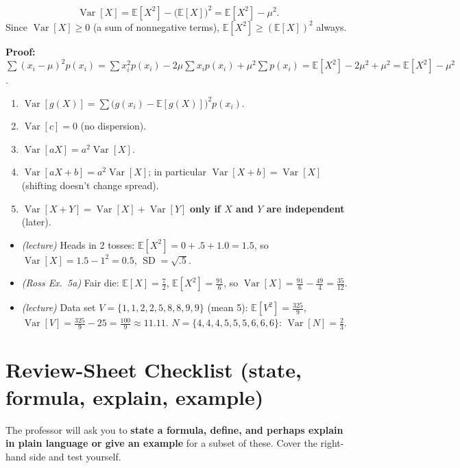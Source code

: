 \documentclass[11pt]{article}
\newcommand{\E}{\mathbb{E}}
\newcommand{\Var}{\operatorname{Var}}
\newcommand{\SD}{\operatorname{SD}}
\begin{document}
\begin{thmbox}
\[ \Var[X]=\E[X^2]-\big(\E[X]\big)^2=\E[X^2]-\mu^2. \]
Since $\Var[X]\ge0$ (a sum of nonnegative terms), $\E[X^2]\ge(\E[X])^2$ always.
\end{thmbox}
\textbf{Proof:} $\sum(x_i-\mu)^2p(x_i)=\sum x_i^2p(x_i)-2\mu\sum x_ip(x_i)+\mu^2\sum p(x_i)=\E[X^2]-2\mu^2+\mu^2=\E[X^2]-\mu^2$.

\begin{thmbox}
\begin{enumerate}
\item $\Var[g(X)]=\sum\big(g(x_i)-\E[g(X)]\big)^2p(x_i)$.
\item $\Var[c]=0$ (no dispersion).
\item $\Var[aX]=a^2\Var[X]$.
\item $\Var[aX+b]=a^2\Var[X]$; in particular $\Var[X+b]=\Var[X]$ (shifting doesn't change spread).
\item $\Var[X+Y]=\Var[X]+\Var[Y]$ \textbf{only if $X$ and $Y$ are independent} (later).
\end{enumerate}
\end{thmbox}

\begin{exbox}[Examples]
\begin{itemize}
\item \emph{(lecture)} Heads in 2 tosses: $\E[X^2]=0+.5+1.0=1.5$, so $\Var[X]=1.5-1^2=0.5$, $\SD=\sqrt{.5}$.
\item \emph{(Ross Ex.\ 5a)} Fair die: $\E[X]=\frac72$, $\E[X^2]=\frac{91}6$, so $\Var[X]=\frac{91}6-\frac{49}4=\frac{35}{12}$.
\item \emph{(lecture)} Data set $V=\{1,1,2,2,5,8,8,9,9\}$ (mean 5): $\E[V^2]=\frac{325}9$, $\Var[V]=\frac{325}9-25=\frac{100}9\approx11.11$. $N=\{4,4,4,5,5,5,6,6,6\}$: $\Var[N]=\frac23$.
\end{itemize}
\end{exbox}

\section{Review-Sheet Checklist (state, formula, explain, example)}\label{sec:checklist}

The professor will ask you to \textbf{state a formula, define, and perhaps explain in plain language or give an example} for a subset of these. Cover the right-hand side and test yourself.
\end{document}
